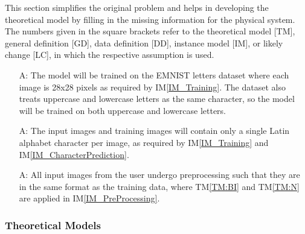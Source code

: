 \documentclass[12pt]{article}
\newcounter{assumpnum} %
\begin{document}

This section simplifies the original problem and helps in developing the
theoretical model by filling in the missing information for the physical system.
The numbers given in the square brackets refer to the theoretical model [TM],
general definition [GD], data definition [DD], instance model [IM], or likely
change [LC], in which the respective assumption is used.

\begin{itemize}

\item[A\refstepcounter{assumpnum}\theassumpnum \label{A_EMNIST}:] The model will be trained on the EMNIST letters dataset where each image is 28x28 pixels as required by IM\ref{IM_Training}. The dataset also treats uppercase and lowercase letters as the same character, so the model will be trained on both uppercase and lowercase letters.
\item[A\refstepcounter{assumpnum}\theassumpnum \label{A_Latin}:] The input images and training images will contain only a single Latin alphabet character per image, as required by IM\ref{IM_Training} and IM\ref{IM_CharacterPrediction}.
\item[A\refstepcounter{assumpnum}\theassumpnum \label{A_Preprocessing}:] All
input images from the user undergo preprocessing such that they are in the same
format as the training data, where TM\ref{TM:BI} and TM\ref{TM:N} are applied in
IM\ref{IM_PreProcessing}.

\end{itemize}

\subsubsection{Theoretical Models}\label{sec_theoretical}
\end{document}
